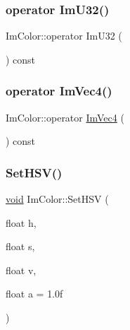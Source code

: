 \mbox{\label{structImColor_a4f4fc53e0676d50404d6d5ffcf16637f}} 
\subsubsection{\texorpdfstring{operator Im\+U32()}{operator ImU32()}}
{\footnotesize\ttfamily Im\+Color\+::operator Im\+U32 (\begin{DoxyParamCaption}{ }\end{DoxyParamCaption}) const\hspace{0.3cm}{\ttfamily [inline]}}

\mbox{\label{structImColor_a10f1de242f13c93f8be64545e4cbcb0a}} 
\subsubsection{\texorpdfstring{operator Im\+Vec4()}{operator ImVec4()}}
{\footnotesize\ttfamily Im\+Color\+::operator \hyperlink{structImVec4}{Im\+Vec4} (\begin{DoxyParamCaption}{ }\end{DoxyParamCaption}) const\hspace{0.3cm}{\ttfamily [inline]}}

\mbox{\label{structImColor_afcff20160db703b956d56e5a9fa88e24}} 
\subsubsection{\texorpdfstring{Set\+H\+S\+V()}{SetHSV()}}
{\footnotesize\ttfamily \hyperlink{imgui__impl__opengl3__loader_8h_ac668e7cffd9e2e9cfee428b9b2f34fa7}{void} Im\+Color\+::\+Set\+H\+SV (\begin{DoxyParamCaption}\item[{float}]{h,  }\item[{float}]{s,  }\item[{float}]{v,  }\item[{float}]{a = {\ttfamily 1.0f} }\end{DoxyParamCaption})\hspace{0.3cm}{\ttfamily [inline]}}



